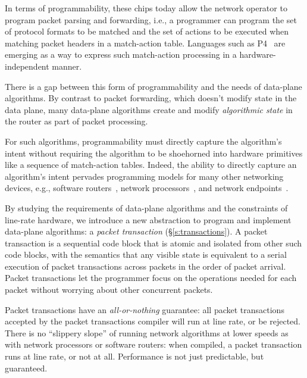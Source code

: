 In terms of programmability, these chips today allow the network operator to
program packet parsing and forwarding, i.e., a programmer can program the set
of protocol formats to be matched and the set of actions to be executed when
matching packet headers in a match-action table. Languages such as P4~\cite{p4}
are emerging as a way to express such match-action processing in a
hardware-independent manner.

There is a gap between this form of programmability and the needs of data-plane
algorithms. By contrast to packet forwarding, which doesn't modify state in the
data plane, many data-plane algorithms create and modify {\em algorithmic
state} in the router as part of packet processing.

For such algorithms, programmability must directly capture the algorithm's
intent without requiring the algorithm to be shoehorned into hardware
primitives like a sequence of match-action tables. Indeed, the ability to
directly capture an algorithm's intent pervades programming models for many
other networking devices, e.g., software routers~\cite{click}, network
processors~\cite{packetc}, and network endpoints~\cite{qdisc}.

By studying the requirements of data-plane algorithms and the constraints of
line-rate hardware, we introduce a new abstraction to program and implement
data-plane algorithms: a {\em packet transaction} (\S\ref{s:transactions}). A
packet transaction is a sequential code block that is atomic and isolated from
other such code blocks, with the semantics that any visible state is equivalent to a serial
execution of packet transactions across packets in the order of packet
arrival.  Packet transactions let the programmer focus on the operations
needed for each packet without worrying about other concurrent packets.

Packet transactions have an \textit{all-or-nothing} guarantee: all packet
transactions accepted by the packet transactions compiler will run at line
rate, or be rejected.  There is no ``slippery slope'' of running network
algorithms at lower speeds as with network processors or software routers: when
compiled, a packet transaction runs at line rate, or not at all.  Performance
is not just predictable, but guaranteed.


